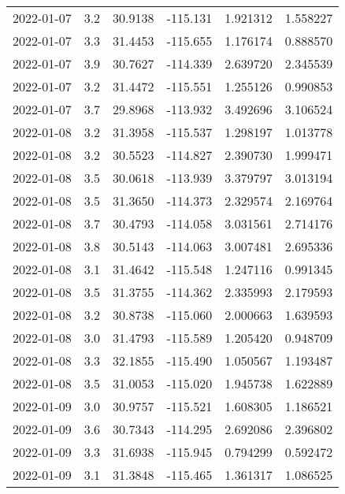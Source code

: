 \begin{tabular}{lrrrrr}
2022-01-07 &       3.2 &  30.9138 &  -115.131 &         1.921312 &         1.558227 \\
2022-01-07 &       3.3 &  31.4453 &  -115.655 &         1.176174 &         0.888570 \\
2022-01-07 &       3.9 &  30.7627 &  -114.339 &         2.639720 &         2.345539 \\
2022-01-07 &       3.2 &  31.4472 &  -115.551 &         1.255126 &         0.990853 \\
2022-01-07 &       3.7 &  29.8968 &  -113.932 &         3.492696 &         3.106524 \\
2022-01-08 &       3.2 &  31.3958 &  -115.537 &         1.298197 &         1.013778 \\
2022-01-08 &       3.2 &  30.5523 &  -114.827 &         2.390730 &         1.999471 \\
2022-01-08 &       3.5 &  30.0618 &  -113.939 &         3.379797 &         3.013194 \\
2022-01-08 &       3.5 &  31.3650 &  -114.373 &         2.329574 &         2.169764 \\
2022-01-08 &       3.7 &  30.4793 &  -114.058 &         3.031561 &         2.714176 \\
2022-01-08 &       3.8 &  30.5143 &  -114.063 &         3.007481 &         2.695336 \\
2022-01-08 &       3.1 &  31.4642 &  -115.548 &         1.247116 &         0.991345 \\
2022-01-08 &       3.5 &  31.3755 &  -114.362 &         2.335993 &         2.179593 \\
2022-01-08 &       3.2 &  30.8738 &  -115.060 &         2.000663 &         1.639593 \\
2022-01-08 &       3.0 &  31.4793 &  -115.589 &         1.205420 &         0.948709 \\
2022-01-08 &       3.3 &  32.1855 &  -115.490 &         1.050567 &         1.193487 \\
2022-01-08 &       3.5 &  31.0053 &  -115.020 &         1.945738 &         1.622889 \\
2022-01-09 &       3.0 &  30.9757 &  -115.521 &         1.608305 &         1.186521 \\
2022-01-09 &       3.6 &  30.7343 &  -114.295 &         2.692086 &         2.396802 \\
2022-01-09 &       3.3 &  31.6938 &  -115.945 &         0.794299 &         0.592472 \\
2022-01-09 &       3.1 &  31.3848 &  -115.465 &         1.361317 &         1.086525 \\

\end{tabular}
